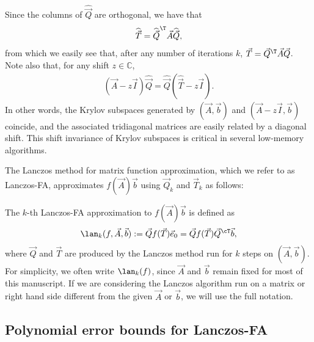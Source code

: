 Since the columns of $\widehat{\vec{Q}}$ are orthogonal, we have that
\begin{align*}
    \widehat{\vec{T}}
    = \widehat{\vec{Q}}^\T \vec{A} \widehat{\vec{Q}},
\end{align*}
from which we easily see that, after any number of iterations $k$, $\vec{T} = \vec{Q}^\T \vec{A} \vec{Q}$.
Note also that, for any shift $z\in\mathbb{C}$, 
\begin{align*}
    (\vec{A} - z\vec{I}) \widehat{\vec{Q}} = \widehat{\vec{Q}} (\widehat{\vec{T}} - z\vec{I}).
\end{align*}
In other words, the Krylov subspaces generated by $(\vec{A},\vec{b})$ and $(\vec{A}-z\vec{I},\vec{b})$ coincide, and the associated tridiagonal matrices are easily related by a diagonal shift. 
This shift invariance of Krylov subspaces is critical in several low-memory algorithms.




The Lanczos method for matrix function approximation, which we refer to as Lanczos-FA, approximates \( f(\vec{A})\vec{b} \) using   \( \vec{Q}_k \) and \( \vec{T}_k \) as follows: 
\begin{definition}
The \( k \)-th Lanczos-FA approximation to \( f(\vec{A}) \vec{b} \) is defined as
\begin{align*}
    \lan_k(f,\vec{A},\vec{b}) 
    := \vec{Q} f(\vec{T}) \vec{e}_0
    = \vec{Q} f(\vec{T}) \vec{Q}^{\cT} \vec{b},
\end{align*}
where \( \vec{Q} \) and \( \vec{T} \) are produced by the Lanczos method run for \( k \) steps on \( (\vec{A},\vec{b}) \).
For simplicity, we often write \( \lan_k(f) \), since \( \vec{A} \) and \( \vec{b} \) remain fixed for most of this manuscript.
If we are considering the Lanczos algorithm run on a matrix or right hand side different from the given \( \vec{A} \) or \( \vec{b} \), we will use the full notation.
\end{definition}


\subsection{Polynomial error bounds for Lanczos-FA}
\label{sec:polynomial_bounds}




